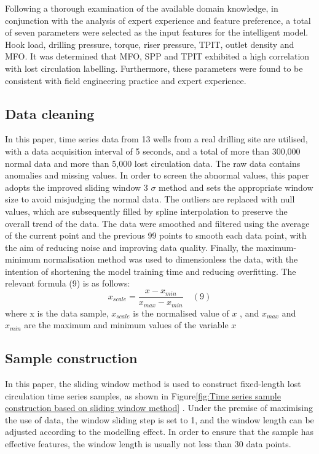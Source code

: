 \documentclass[journal,article,submit,pdftex,moreauthors]{Definitions/mdpi}
\begin{document}
Following a thorough examination of the available domain knowledge, in conjunction with the analysis of expert experience and feature preference, a total of seven parameters were selected as the input features for the intelligent model. Hook load, drilling pressure, torque, riser pressure, TPIT, outlet density and MFO. It was determined that MFO, SPP and TPIT exhibited a high correlation with lost circulation labelling. Furthermore, these parameters were found to be consistent with field engineering practice and expert experience.

\subsection{Data cleaning}

In this paper, time series data from 13 wells from a real drilling site are utilised, with a data acquisition interval of 5 seconds, and a total of more than 300,000 normal data and more than 5,000 lost circulation data. The raw data contains anomalies and missing values. In order to screen the abnormal values, this paper adopts the improved sliding window 3 \(\sigma\) method and sets the appropriate window size to avoid misjudging the normal data. The outliers are replaced with null values, which are subsequently filled by spline interpolation to preserve the overall trend of the data. The data were smoothed and filtered using the average of the current point and the previous 99 points to smooth each data point, with the aim of reducing noise and improving data quality. Finally, the maximum-minimum normalisation method was used to dimensionless the data, with the intention of shortening the model training time and reducing overfitting. The relevant formula (9) is as follows:
$$ x _ { s c a l e } = \frac { x - x _ { m i n } } { x _ { m a x } - x _ { m i n } }\quad (9)$$
where x is the data sample, \({{x}_{scale}}\) is the normalised value of \({{x}}\) , and \({{x}_{max}}\)  and \({{x}_{min}}\)  are the maximum and minimum values of the variable \({{x}}\)
\subsection{Sample construction}

In this paper, the sliding window method is used to construct fixed-length  lost circulation time series samples, as shown in Figure\ref{fig:Time series sample construction based on sliding window method} . Under the premise of maximising the use of data, the window sliding step is set to 1, and the window length can be adjusted according to the modelling effect. In order to ensure that the sample has effective features, the window length is usually not less than 30 data points.
\end{document}
